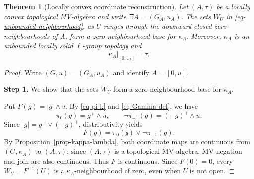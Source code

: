 \documentclass[preprint,3p]{elsarticle}
\theoremstyle{plain}
\newtheorem{thm}{Theorem}[section]
\theoremstyle{definition}
\numberwithin{equation}{section}
\begin{document}
\begin{thm}[Locally convex coordinate reconstruction]
\label{lem-unbounded-lift}
\label{thm-locally-convex-reconstruction}
Let $(A,\tau)$ be a locally convex topological MV-algebra and write
$\Xi A=(G_A,u_A)$.  The sets $W_U$ in
\eqref{eq-unbounded-neighbourhood}, as $U$ ranges through the
downward-closed zero-neighbourhoods of $A$, form a zero-neighbourhood
base for $\kappa_A$.  Moreover, $\kappa_A$ is an unbounded locally solid
$\ell$-group topology and
\[
 \kappa_A|_{[0,u_A]}=\tau.
\]
\end{thm}

\begin{proof}
Write $(G,u)=(G_A,u_A)$ and identify $A=[0,u]$.

\textbf{Step 1.} We show that the sets $W_U$ form a zero-neighbourhood
base for $\kappa_A$.

Put $F(g)=|g|\wedge u$.  By \eqref{eq-pi-k} and \eqref{eq-Gamma-def}, we have
\[
 \pi_0(g)=g^+\wedge u,
 \qquad \neg\pi_{-1}(g)=(-g)^+\wedge u.
\]
Since $|g|=g^+\vee(-g)^+$, distributivity yields
\begin{equation}
\label{eq-modulus-coordinate-truncation}
 F(g)=\pi_0(g)\vee\neg\pi_{-1}(g).
\end{equation}
By Proposition~\ref{prop-kappa-lambda}, both coordinate maps
are continuous from $(G,\kappa_A)$ to $(A,\tau)$;
since $(A,\tau)$ is a topological MV-algebra,
MV-negation and join are also continuous.
Thus $F$ is continuous. 
Since $F(0)=0$, every
$W_U=F^{-1}(U)$ is a $\kappa_A$-neighbourhood of zero, even when
$U$ is not open.


\end{proof}
\end{document}
